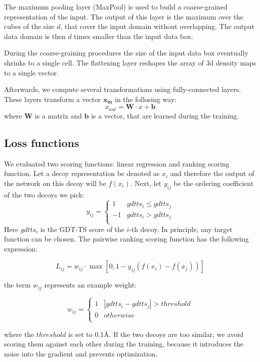 \documentclass[a4paper,10pt]{article}
\begin{document}
The maximum pooling layer (MaxPool) is used to build a coarse-grained representation of the input. The output of this layer is 
the maximum over the cubes of the size $d$, that cover the input domain without overlapping. 
The output data domain is then $d$ times smaller than the input data box.

During the coarse-graining procedures the size of the input data box eventually shrinks to a single cell. The flattening layer reshapes the array of 
3d density maps to a single vector.

Afterwards, we compute several transformations using fully-connected layers. These layers transform a vector $\mathbf{x_{in}}$ in the follosing way:
$$
x_{out} = \mathbf{W} \cdot x + \mathbf{b}
$$
where $\mathbf{W}$ is a matrix and $\mathbf{b}$ is a vector, that are learned during the training.


\subsection{Loss functions}
We evaluated two scoring functions: linear regression and ranking scoring function. 
Let a decoy representation be denoted as $x_i$ and therefore the output
of the network on this decoy will be $f(x_i)$. Next, let $y_{ij}$ be the ordering coefficient of the two decoys we pick: 
$$
y_{ij} = \begin{cases}
               1& gdtts_i \leq gdtts_j \\
               -1& gdtts_i > gdtts_j \\
            \end{cases}
$$
Here $gdtts_i$ is the GDT-TS score of the $i$-th decoy. In principle, any target function can be chosen. 
The pairwise ranking scoring function has the following expression:

$$ L_{ij} = w_{ij} \cdot \max \left[ 0, 1 - y_{ij} \left( f \left( x_i \right) - f \left( x_j \right) \right) \right] $$

the term $w_{ij}$ represents an example weight:

$$
w_{ij} = \begin{cases}
               1& \left| gdtts_i - gdtts_j \right| > threshold \\
               0& otherwise \\ 
            \end{cases}
$$

where the $threshold$ is set to 0.1{\AA}. If the two decoys are too similar, 
we avoid scoring them against each other during the training, because it introduces 
the noise into the gradient and prevents optimization.
\end{document}

